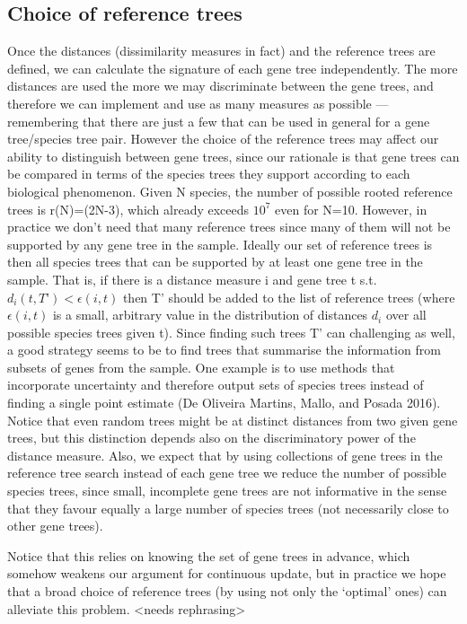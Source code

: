 \subsection{Choice of reference trees}
Once the distances (dissimilarity measures in fact) and the reference trees are defined, we can calculate the signature
of each gene tree independently. The more distances are used the more we may discriminate between the gene trees, and
therefore we can implement and use as many measures as possible --- remembering that there are just a few that can be used
in general for a gene tree/species tree pair. However the choice of the reference trees may affect our ability to
distinguish between gene trees, since our rationale is that gene trees can be compared in terms of the species trees
they support according to each biological phenomenon. Given N species, the number of possible rooted reference trees is
r(N)=(2N-3)\!\!, which already exceeds $10^7$ even for N=10. However, in practice we don’t need that many reference trees
since many of them will not be supported by any gene tree in the sample. Ideally our set of reference trees is then all
species trees that can be supported by at least one gene tree in the sample. That is, if there is a distance measure i
and gene tree t  s.t. $d_i(t,T’) < \epsilon(i,t)$ then T’ should be added to the list of reference trees (where
$\epsilon(i,t)$ is a
small, arbitrary value in the distribution of distances $d_i$ over all possible species trees given t). Since finding such
trees T’ can challenging as well, a good strategy seems to be to find trees that summarise the information from subsets
of genes from the sample. One example is to use methods that incorporate uncertainty and therefore output sets of
species trees instead of finding a single point estimate (De Oliveira Martins, Mallo, and Posada 2016). Notice that even
random trees might be at distinct distances from two given gene trees, but this distinction depends also on the
discriminatory power of the distance measure. Also, we expect that by using collections of gene trees in the reference
tree search instead of each gene tree we reduce the number of possible species trees, since small, incomplete gene trees
are not informative in the sense that they favour equally a large number of species trees (not necessarily close to
other gene trees).

Notice that this relies on knowing the set of gene trees in advance, which somehow weakens our argument for continuous
update, but in practice we hope that a broad choice of reference trees (by using not only the ‘optimal’ ones) can
alleviate this problem. <needs rephrasing>

